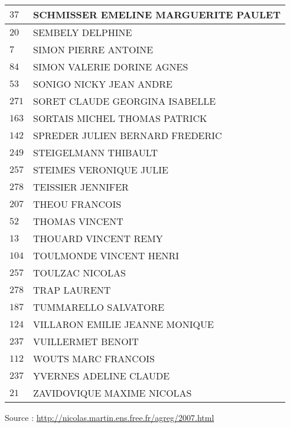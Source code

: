 \begin{xltabular}{\linewidth}{|l|X|}
    \hline
    $37$ & SCHMISSER EMELINE MARGUERITE PAULET \\
    \hline
    $20$ & SEMBELY DELPHINE \\
    \hline
    $7$ & SIMON PIERRE ANTOINE \\
    \hline
    $84$ & SIMON VALERIE DORINE AGNES \\
    \hline
    $53$ & SONIGO NICKY JEAN ANDRE \\
    \hline
    $271$ & SORET CLAUDE GEORGINA ISABELLE \\
    \hline
    $163$ & SORTAIS MICHEL THOMAS PATRICK \\
    \hline
    $142$ & SPREDER JULIEN BERNARD FREDERIC \\
    \hline
    $249$ & STEIGELMANN THIBAULT \\
    \hline
    $257$ & STEIMES VERONIQUE JULIE \\
    \hline
    $278$ & TEISSIER JENNIFER \\
    \hline
    $207$ & THEOU FRANCOIS \\
    \hline
    $52$ & THOMAS VINCENT \\
    \hline
    $13$ & THOUARD VINCENT REMY \\
    \hline
    $104$ & TOULMONDE VINCENT HENRI \\
    \hline
    $257$ & TOULZAC NICOLAS \\
    \hline
    $278$ & TRAP LAURENT \\
    \hline
    $187$ & TUMMARELLO SALVATORE \\
    \hline
    $124$ & VILLARON EMILIE JEANNE MONIQUE \\
    \hline
    $237$ & VUILLERMET BENOIT \\
    \hline
    $112$ & WOUTS MARC FRANCOIS \\
    \hline
    $237$ & YVERNES ADELINE CLAUDE \\
    \hline
    $21$ & ZAVIDOVIQUE MAXIME NICOLAS \\
    \hline
  \end{xltabular}

  \begin{flushright}
    {\tiny Source : \url{http://nicolas.martin.ens.free.fr/agreg/2007.html}}
  \end{flushright}

